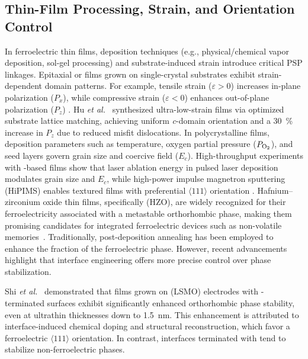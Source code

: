\documentclass[a4paper,fleqn]{cas-sc}
\begin{document}
\subsection*{Thin-Film Processing, Strain, and Orientation Control}

\par In ferroelectric thin films, deposition techniques (e.g., physical/chemical vapor deposition, sol-gel processing) and substrate-induced strain introduce critical PSP linkages. Epitaxial  or  films grown on single-crystal substrates exhibit strain-dependent domain patterns. For example, tensile strain (\(\varepsilon > 0\)) increases in-plane polarization (\(P_x\)), while compressive strain (\(\varepsilon < 0\)) enhances out-of-plane polarization (\(P_z\)) \cite{hu2025ultra}. Hu \textit{et al.}~\cite{hu2025ultra} synthesized ultra-low-strain  films via optimized substrate lattice matching, achieving uniform \textit{c}-domain orientation and a \SI{30}{\percent} increase in \(P_z\) due to reduced misfit dislocations. In polycrystalline films, deposition parameters such as temperature, oxygen partial pressure (\(P_{\ce{O2}}\)), and seed layers govern grain size and coercive field (\(E_c\)). High-throughput experiments with -based films show that laser ablation energy in pulsed laser deposition modulates grain size and \(E_c\), while high-power impulse magnetron sputtering (HiPIMS) enables textured  films with preferential \(\langle 111 \rangle\) orientation \cite{kim2025coercive}.
Hafnium–zirconium oxide thin films, specifically  (HZO), are widely recognized for their ferroelectricity associated with a metastable orthorhombic phase, making them promising candidates for integrated ferroelectric devices such as non-volatile memories~\cite{fan2025hidden}. Traditionally, post-deposition annealing has been employed to enhance the fraction of the ferroelectric phase. However, recent advancements highlight that interface engineering offers more precise control over phase stabilization.

Shi \textit{et al.}~\cite{shi2023interface} demonstrated that  films grown on  (LSMO) electrodes with -terminated surfaces exhibit significantly enhanced orthorhombic phase stability, even at ultrathin thicknesses down to \SI{1.5}{\nano\meter}. This enhancement is attributed to interface-induced chemical doping and structural reconstruction, which favor a ferroelectric \(\langle 111 \rangle\) orientation. In contrast, interfaces terminated with  tend to stabilize non-ferroelectric phases. 
\end{document}
